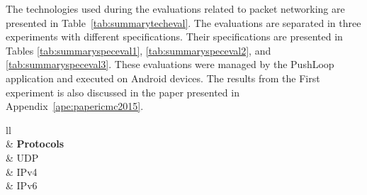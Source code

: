 The technologies used during the evaluations related to packet networking are presented in Table~\ref{tab:summarytecheval}.
The evaluations are separated in three experiments with different specifications.
Their specifications are presented in Tables \ref{tab:summaryspeceval1}, \ref{tab:summaryspeceval2}, and \ref{tab:summaryspeceval3}.
These evaluations were managed by the PushLoop application and executed on Android devices.
The results from the First experiment is also discussed in the paper presented in Appendix~\ref{ape:papericmc2015}.

\begin{table}[!ht]
	\centering
	\begin{tabular}{ll}
		 \\ \hline
		 & \textbf{Protocols} \\ \hline
		                                                           & UDP       \\ \hline
		                                                                  & IPv4      \\ \hline
		                                                               & IPv6      \\ \hline
	\end{tabular}
	\caption{Summary of Network technologies evaluated in Chapter~\ref{cap:evaluations}.}
	\label{tab:summarytecheval}
\end{table}


